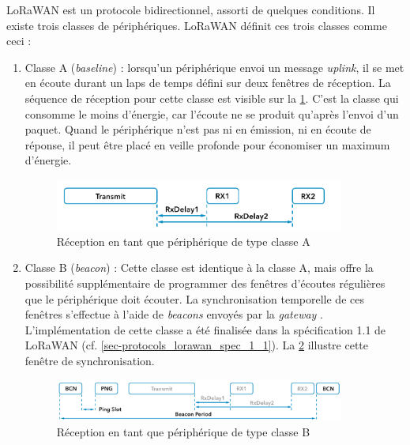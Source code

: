 LoRaWAN est un protocole bidirectionnel, assorti de quelques conditions. Il existe trois classes de périphériques. LoRaWAN définit ces trois classes \cite{LoRaWANd15:online} comme ceci : 
\begin{enumerate}
    \item Classe A (\textit{baseline}) : lorsqu'un périphérique envoi un message \textit{uplink}, il se met en écoute durant un laps de temps défini sur deux fenêtres de réception. La séquence de réception pour cette classe est visible sur la \cref{fig-class_a_rx}. C'est la classe qui consomme le moins d'énergie, car l'écoute ne se produit qu'après l'envoi d'un paquet. Quand le périphérique n'est pas ni en émission, ni en écoute de réponse, il peut être placé en veille profonde pour économiser un maximum d'énergie.
    
\begin{figure}[ht!]
    \centering
    \includegraphics[width=0.9\textwidth]{Figures/Protocols/LoRaWAN/class_a_rx.png}
    \caption{Réception en tant que périphérique de type classe A}
    \label{fig-class_a_rx}
\end{figure}

    
    \item Classe B (\textit{beacon}) : Cette classe est identique à la classe A, mais offre la possibilité supplémentaire de programmer des fenêtres d'écoutes régulières que le périphérique doit écouter. La synchronisation temporelle de ces fenêtres s'effectue à l'aide de \textit{beacons} envoyés par la \textit{gateway} \cite{HomeTheT94:online,}. L'implémentation de cette classe a été finalisée dans la spécification 1.1 de LoRaWAN (cf. \cref{sec-protocols_lorawan_spec_1_1}). La \cref{fig-class_b_rx} illustre cette fenêtre de synchronisation.
   
\begin{figure}[ht!]
    \centering
    \includegraphics[width=0.9\textwidth]{Figures/Protocols/LoRaWAN/class_b_rx.png}
    \caption{Réception en tant que périphérique de type classe B}
    \label{fig-class_b_rx}
\end{figure} 


\end{enumerate}
